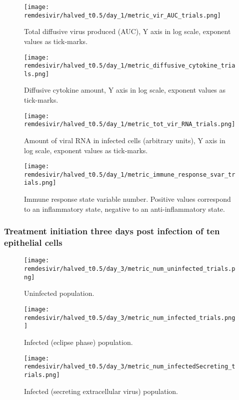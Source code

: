 \begin{figure}[H]
\texttt{[image: remdesivir/halved\_t0.5/day\_1/metric\_vir\_AUC\_trials.png]}
\caption{Total diffusive virus produced (AUC), Y axis in log scale, exponent values as tick-marks.\label{fig:app:homo_halved:day1:auc_vir}}
\end{figure}

\begin{figure}[H]
\texttt{[image: remdesivir/halved\_t0.5/day\_1/metric\_diffusive\_cytokine\_trials.png]}
\caption{Diffusive cytokine amount, Y axis in log scale, exponent values as tick-marks.\label{fig:app:homo_halved:day1:diff_cyto}}
\end{figure}

\begin{figure}[H]
\texttt{[image: remdesivir/halved\_t0.5/day\_1/metric\_tot\_vir\_RNA\_trials.png]}
\caption{Amount of viral RNA in infected cells (arbitrary units), Y axis in log scale, exponent values as tick-marks.\label{fig:app:homo_halved:day1:vir_RNA}}
\end{figure}

\begin{figure}[H]
\texttt{[image: remdesivir/halved\_t0.5/day\_1/metric\_immune\_response\_svar\_trials.png]}
\caption{Immune response state variable number. Positive values correspond to an inflammatory state, negative to an anti-inflammatory state.\label{fig:app:homo_halved:day1:immune_var}}
\end{figure}
\subsubsection{Treatment initiation three days post infection of ten epithelial cells}\label{sup:sec:extra_figures:homo_halved:day3}

\begin{figure}[H]
\texttt{[image: remdesivir/halved\_t0.5/day\_3/metric\_num\_uninfected\_trials.png]}
\caption{Uninfected population.\label{fig:app:homo_halved:day3:uninf}}
\end{figure}

\begin{figure}[H]
\texttt{[image: remdesivir/halved\_t0.5/day\_3/metric\_num\_infected\_trials.png]}
\caption{Infected (eclipse phase) population.\label{fig:app:homo_halved:day3:inf}}
\end{figure}

\begin{figure}[H]
\texttt{[image: remdesivir/halved\_t0.5/day\_3/metric\_num\_infectedSecreting\_trials.png]}
\caption{Infected (secreting extracellular virus) population.\label{fig:app:homo_halved:day3:infSecr}}
\end{figure}

